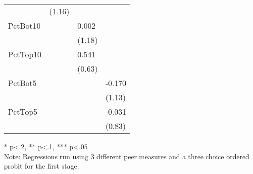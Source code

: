 \begin{table}[htb]
\begin{threeparttable}
\begin{tabular}{l l l l}
               & (1.16)                        &                               &                              \\
      PctBot10 &                               & 0.002                         &                              \\
               &                               & (1.18)                        &                              \\
      PctTop10 &                               & 0.541                         &                              \\
               &                               & (0.63)                        &                              \\
      PctBot5  &                               &                               & -0.170                       \\
               &                               &                               & (1.13)                       \\
      PctTop5  &                               &                               & -0.031                       \\
               &                               &                               & (0.83)                       \\
      \hline
      \hline
    \end{tabular}
    \begin{tablenotes}
    \item{* p<.2, ** p<.1, *** p<.05 \\Note: Regressions run using 3 different peer measures and a three choice ordered probit for the first stage.}
    \end{tablenotes}
  \end{threeparttable}
\end{table}

\clearpage{}

